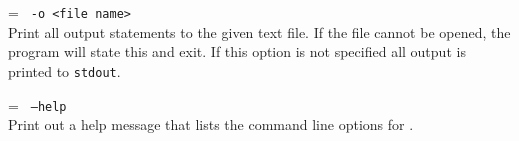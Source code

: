 \breakline

\noindent\hangindent=\parindent
\texttt{%
-o <file name>
}\\
Print all output statements to the given text file. If the file cannot be
opened, the program will state this and exit. If this option is not specified
all output is printed to \texttt{stdout}.

\breakline

\noindent\hangindent=\parindent
\texttt{%
--help
}\\
Print out a help message that lists the command line options for \progLogo.

